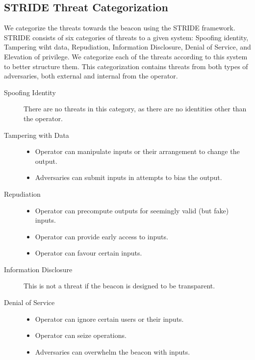 \subsection{STRIDE Threat Categorization}
We categorize the threats towards the beacon using the STRIDE framework. STRIDE consists of six categories of threats to a given system: Spoofing identity, Tampering wiht data, Repudiation, Information Disclosure, Denial of Service, and Elevation of privilege. We categorize each of the threats according to this system to better structure them. This categorization contains threats from both types of adversaries, both external and internal from the operator. 

\begin{description}
    \item [Spoofing Identity] There are no threats in this category, as there are no identities other than the operator. 
    \item [Tampering with Data] \begin{itemize}
                                    \item Operator can manipulate inputs or their arrangement to change the output.
                                    \item Adversaries can submit inputs in attempts to bias the output. 
                                \end{itemize}
    \item [Repudiation] \begin{itemize}
                            \item Operator can precompute outputs for seemingly valid (but fake) inputs.
                            \item Operator can provide early access to inputs.
                            \item Operator can favour certain inputs. 
                        \end{itemize}
    \item [Information Disclosure] This is not a threat if the beacon is designed to be transparent. 
    \item [Denial of Service] \begin{itemize}
                                \item Operator can ignore certain users or their inputs. 
                                \item Operator can seize operations. 
                                \item Adversaries can overwhelm the beacon with inputs. 

\end{itemize}
\end{description}
